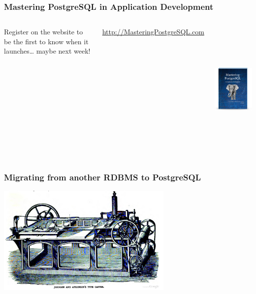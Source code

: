\documentclass{beamer}
\begin{document}
\begin{frame}
  \frametitle{Mastering PostgreSQL in Application Development}

  \begin{columns}[c]
    \begin{minipage}[t][12em][t]{\textwidth}
      
      \vfill
      
      Register on the website to be the first to know when it launches…
      maybe next week!

      \vfill
      \url{http://MasteringPostgreSQL.com}
    \end{minipage}

    \begin{center}
      \href{http://MasteringPostgreSQL.com}
           {\includegraphics[height=18em]{MasteringPostgreSQLinAppDev-Cover.png}}
    \end{center}
  \end{columns}
\end{frame}

\begin{frame}
  \frametitle{Migrating from another RDBMS to PostgreSQL}

  \begin{center}
    \includegraphics[height=2.1in]{TypeCaster.jpg}
  \end{center}
\end{frame}
\end{document}
